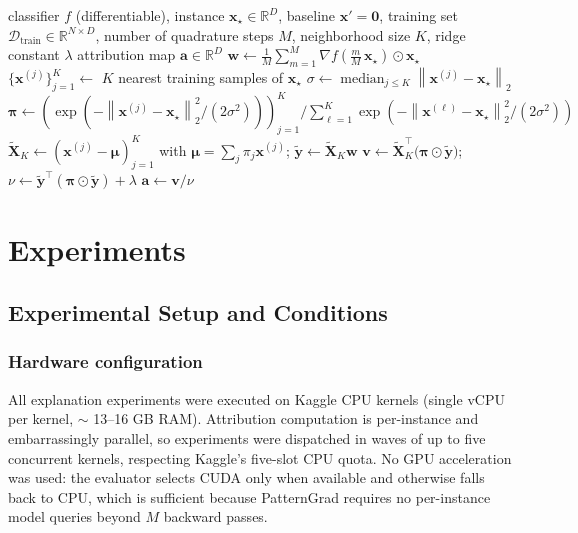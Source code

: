 \documentclass[pdflatex,sn-mathphys-num]{sn-jnl}
\theoremstyle{thmstyleone}
\theoremstyle{thmstyletwo}%
\theoremstyle{thmstylethree}%
\begin{document}
\begin{algorithm}
\caption{PatternGrad attribution}\label{algo:patterngrad}
\begin{algorithmic}[1]
\Require classifier $f$ (differentiable), instance $\mathbf{x}_\star \in \mathbb{R}^D$, baseline $\mathbf{x}' = \mathbf{0}$, training set $\mathcal{D}_{\text{train}} \in \mathbb{R}^{N \times D}$, number of quadrature steps $M$, neighborhood size $K$, ridge constant $\lambda$
\Ensure attribution map $\mathbf{a} \in \mathbb{R}^D$
\State $\mathbf{w} \leftarrow \tfrac{1}{M} \sum_{m=1}^{M} \nabla f\!\left(\tfrac{m}{M}\, \mathbf{x}_\star\right) \odot \mathbf{x}_\star$ 
\State $\{\mathbf{x}^{(j)}\}_{j=1}^{K} \leftarrow$ $K$ nearest training samples of $\mathbf{x}_\star$
\State $\sigma \leftarrow \operatorname{median}_{j \leq K} \left\| \mathbf{x}^{(j)} - \mathbf{x}_\star \right\|_2$ 
\State $\boldsymbol{\pi} \leftarrow \left(\exp\!\left(-{\left\|\mathbf{x}^{(j)} - \mathbf{x}_\star\right\|_2^2}/({2\sigma^2})\right)\right)_{j=1}^{K} / \sum_{\ell=1}^{K} \exp\!\left(-{\left\|\mathbf{x}^{(\ell)} - \mathbf{x}_\star\right\|_2^2}/({2\sigma^2})\right)$ 
\State $\tilde{\mathbf{X}}_K \leftarrow (\mathbf{x}^{(j)} - \boldsymbol{\mu})_{j=1}^{K}$ with $\boldsymbol{\mu} = \sum_j \pi_j \mathbf{x}^{(j)}$; \; $\tilde{\mathbf{y}} \leftarrow \tilde{\mathbf{X}}_K \mathbf{w}$
\State $\mathbf{v} \leftarrow \tilde{\mathbf{X}}_K^\top \big(\boldsymbol{\pi} \odot \tilde{\mathbf{y}}\big)$; \; $\nu \leftarrow \tilde{\mathbf{y}}^\top (\boldsymbol{\pi} \odot \tilde{\mathbf{y}}) + \lambda$ 
\State \Return $\mathbf{a} \leftarrow \mathbf{v} / \nu$
\end{algorithmic}
\end{algorithm}

\section{Experiments}\label{sec3}
\subsection{Experimental Setup and Conditions}

\subsubsection{Hardware configuration}
All explanation experiments were executed on Kaggle CPU kernels (single vCPU per kernel, $\sim$ 13--16 GB RAM). Attribution computation is per-instance and embarrassingly parallel, so experiments were dispatched in waves of up to five concurrent kernels, respecting Kaggle's five-slot CPU quota. No GPU acceleration was used: the evaluator selects CUDA only when available and otherwise falls back to CPU, which is sufficient because PatternGrad requires no per-instance model queries beyond $M$ backward passes.
\end{document}

